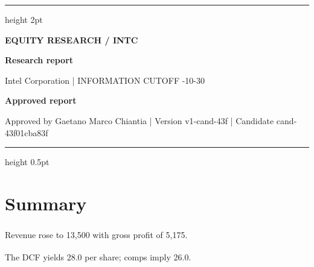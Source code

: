 \documentclass[11pt,a4paper]{article}
\newcommand{\evref}[1]{\textsuperscript{\sffamily\color{muted}\fontsize{7}{8}\selectfont[#1]}}
\begin{document}
\justifying
\setlength{\parindent}{0pt}
\vspace*{2mm}
{\color{accent}\hrule height 2pt}
\vspace{7mm}
{\sffamily\small\bfseries\color{accent} EQUITY RESEARCH \quad / \quad INTC}\par
\vspace{3mm}
{\fontsize{25}{30}\selectfont\bfseries Research report}\par
\vspace{4mm}
{\sffamily\small\color{muted} Intel Corporation \quad | \quad INFORMATION CUTOFF -10-30}\par
\vspace{4mm}
{\sffamily\small\bfseries\color{amber} Approved report}\par
{\sffamily\footnotesize\color{muted} Approved by Gaetano Marco Chiantia \quad | \quad Version v1-cand-43f \quad | \quad Candidate cand-43f01cba83f}\par
\vspace{2mm}
{\color{line}\hrule height 0.5pt}
\vspace{1mm}
\fontsize{11}{15.2}\selectfont
{}
\section*{Summary}
Revenue rose to 13,500\evref{1} with gross profit of 5,175\evref{2}.

The DCF yields 28.0\evref{3} per share; comps imply 26.0\evref{4}.

\clearpage
\end{document}
